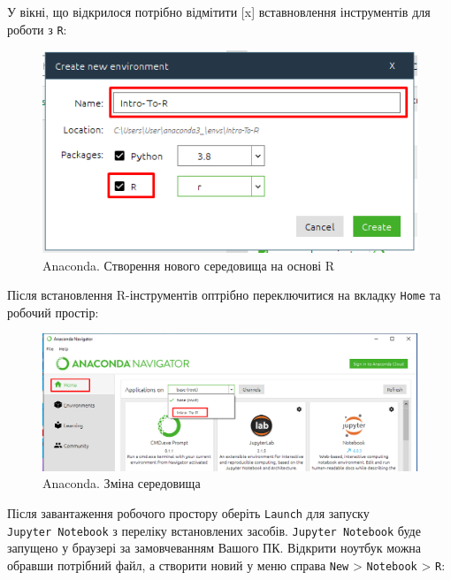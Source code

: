\documentclass[
]{book}
\begin{document}
У вікні, що відкрилося потрібно відмітити {[}x{]} вставновлення інструментів для роботи з \texttt{R}:

\begin{figure}
\centering
\includegraphics{images/chapter1/anaconda_3.png}
\caption{\label{fig:unnamed-chunk-25}Anaconda. Створення нового середовища на основі R}
\end{figure}

Після встановлення R-інструментів оптрібно переключитися на вкладку \texttt{Home} та робочий простір:

\begin{figure}
\centering
\includegraphics{images/chapter1/anaconda_4.png}
\caption{\label{fig:unnamed-chunk-26}Anaconda. Зміна середовища}
\end{figure}

Після завантаження робочого простору оберіть \texttt{Launch} для запуску \texttt{Jupyter\ Notebook} з переліку встановлених засобів. \texttt{Jupyter\ Notebook} буде запущено у браузері за замовчеванням Вашого ПК. Відкрити ноутбук можна обравши потрібний файл, а створити новий у меню справа \texttt{New} \textgreater{} \texttt{Notebook} \textgreater{} \texttt{R}:
\end{document}

